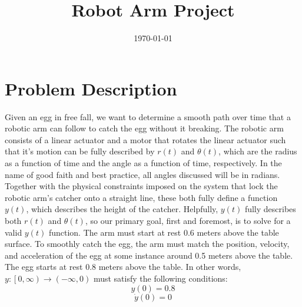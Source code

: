 \documentclass[nofoot,pdf-a,balance,upint,subscriptcorrection,varvw]{asmeconf}
\begin{document}
    
    \title{Robot Arm Project}
    \date{\today}

    \maketitle

    \section*{Problem Description}
	
    \tab Given an egg in free fall, we want to determine a smooth path over time that a robotic arm can follow to catch the egg without it breaking. The robotic arm consists of a linear actuator and a motor that rotates the linear actuator such that it's motion can be fully described by $r\left(t\right)$ and $\theta\left(t\right)$, which are the radius as a function of time and the angle as a function of time, respectively. In the name of good faith and best practice, all angles discussed will be in radians. Together with the physical constraints imposed on the system that lock the robotic arm's catcher onto a straight line, these both fully define a function $y\left(t\right)$, which describes the height of the catcher. Helpfully, $y\left(t\right)$ fully describes both $r\left(t\right)$ and $\theta\left(t\right)$, so our primary goal, first and foremost, is to solve for a valid $y\left(t\right)$ function. The arm must start at rest 0.6 meters above the table surface. To smoothly catch the egg, the arm must match the position, velocity, and acceleration of the egg at some instance around 0.5 meters above the table. The egg starts at rest 0.8 meters above the table.\newline \newline 
    In other words, $y:\left[0, \infty\right) \to \left(-\infty, 0\right)
$ must satisfy the following conditions:
    \begin{equation}
        y\left(0\right) = 0.8
    \end{equation}
    \begin{equation}
        \dot{y}\left(0\right) = 0
    \end{equation}
	
\end{document}
